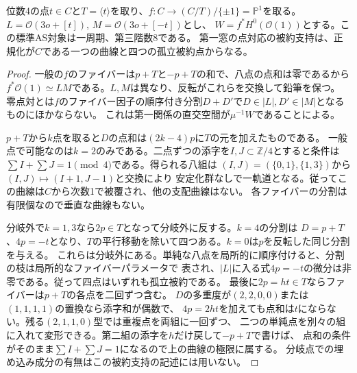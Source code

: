 \begin{proposition}[正次元の点対応を持つ楕円鉛筆]\label{prop:elliptic-pencil-dihedral}
位数4の点$t\in C$と$T=\langle t\rangle$を取り、$f:C\to(C/T)/\{\pm1\}=\mathbb P^1$を取る。
$L=\mathcal O(3o+[t])$, $M=\mathcal O(3o+[-t])$とし、
$W=f^*H^0(\mathcal O(1))$とする。この標準AS対象は一周期、第三階数8である。
第一窓の点対応の被約支持は、正規化が$C$である一つの曲線と四つの孤立被約点からなる。
\end{proposition}
\begin{proof}
一般の$f$のファイバーは$p+T$と$-p+T$の和で、八点の点和は零であるから
$f^*\mathcal O(1)\simeq LM$である。$L,M$は異なり、反転がこれらを交換して鉛筆を保つ。
零点対とは$f$のファイバー因子の順序付き分割$D+D'$で$D\in|L|,D'\in|M|$となるものにほかならない。
これは第一関係の直交空間が$\mu^{-1}W$であることによる。

$p+T$から$k$点を取ると$D$の点和は$(2k-4)p$に$T$の元を加えたものである。
一般点で可能なのは$k=2$のみである。二点ずつの添字を$I,J\subset\mathbb Z/4$とすると条件は
$\sum I+\sum J=1\pmod4$である。得られる八組は
$(I,J)=(\{0,1\},\{1,3\})$から$(I,J)\mapsto(I+1,J-1)$と交換により
安定化群なしで一軌道となる。従ってこの曲線は$C$から次数1で被覆され、他の支配曲線はない。
各ファイバーの分割は有限個なので垂直な曲線もない。

分岐外で$k=1,3$なら$2p\in T$となって分岐外に反する。$k=4$の分割は
$D=p+T$、$4p=-t$となり、$T$の平行移動を除いて四つある。$k=0$は$p$を反転した同じ分割を与える。
これらは分岐外にある。単純な八点を局所的に順序付けると、分割の枝は局所的なファイバーパラメータで
表され、$|L|$に入る式$4p=-t$の微分は非零である。従って四点はいずれも孤立被約である。
最後に$2p=ht\in T$ならファイバーは$p+T$の各点を二回ずつ含む。
$D$の多重度が$(2,2,0,0)$または$(1,1,1,1)$の置換なら添字和が偶数で、
$4p=2ht$を加えても点和は$t$にならない。残る$(2,1,1,0)$型では重複点を両組に一回ずつ、
二つの単純点を別々の組に入れて変形できる。第二組の添字を$h$だけ戻して$-p+T$で書けば、
点和の条件がそのまま$\sum I+\sum J=1$になるので上の曲線の極限に属する。
分岐点での埋め込み成分の有無はこの被約支持の記述には用いない。
\end{proof}

